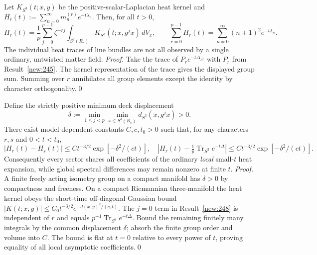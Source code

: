 \begin{result}\label{new:248}
Let $K_{S^3}(t;x,y)$ be the positive-scalar-Laplacian heat kernel and $H_r(t):=\sum_{n=0}^{\infty}m_n^{(r)}e^{-t\lambda_n}$. Then, for all $t>0$,
\begin{equation}\label{eq:twisted248}
 H_r(t)=\frac1p\sum_{j=0}^{p-1}\zeta^{-rj}\int_{S^3(R_c)}K_{S^3}(t;x,g^jx)\,dV_x,
 \qquad \sum_{r=0}^{p-1}H_r(t)=\sum_{n=0}^{\infty}(n+1)^2e^{-t\lambda_n}.
\end{equation}
The individual heat traces of line bundles are not all observed by a single ordinary, untwisted matter field.
\textit{Proof.} Take the trace of $P_r e^{-t\Delta_{S^3}}$ with $P_r$ from Result~\ref{new:245}. The kernel representation of the trace gives the displayed group sum. Summing over $r$ annihilates all group elements except the identity by character orthogonality.\qed
\end{result}

\begin{result}\label{new:249}
Define the strictly positive minimum deck displacement
\begin{equation}\label{eq:twisted249}
 \delta:=\min_{1\le j<p}\min_{x\in S^3(R_c)}d_{S^3}(x,g^jx)>0.
\end{equation}
There exist model-dependent constants $C,c,t_0>0$ such that, for any characters $r,s$ and $0<t<t_0$,
\begin{equation}\label{eq:twisted249b}
 |H_r(t)-H_s(t)|\le C t^{-3/2}\exp[-\delta^2/(ct)],\quad
 \left|H_r(t)-\tfrac1p\operatorname{Tr}_{S^3}e^{-t\Delta}\right|\le C t^{-3/2}\exp[-\delta^2/(ct)].
\end{equation}
Consequently every sector shares all coefficients of the ordinary \emph{local} small-$t$ heat expansion, while global spectral differences may remain nonzero at finite $t$.
\textit{Proof.} A finite freely acting isometry group on a compact manifold has $\delta>0$ by compactness and freeness. On a compact Riemannian three-manifold the heat kernel obeys the short-time off-diagonal Gaussian bound $|K(t;x,y)|\le C_0t^{-3/2}e^{-d(x,y)^2/(c_0t)}$. The $j=0$ term in Result~\ref{new:248} is independent of $r$ and equals $p^{-1}\operatorname{Tr}_{S^3}e^{-t\Delta}$. Bound the remaining finitely many integrals by the common displacement $\delta$; absorb the finite group order and volume into $C$. The bound is flat at $t=0$ relative to every power of $t$, proving equality of all local asymptotic coefficients.\qed
\end{result}

